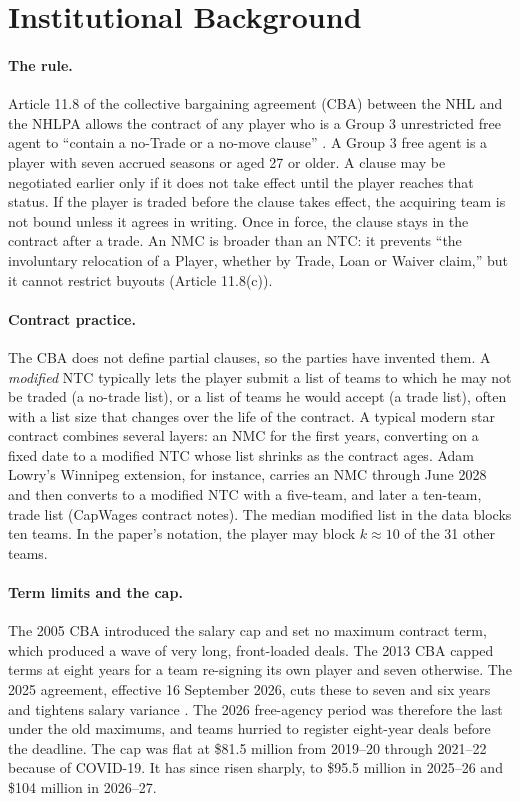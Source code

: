 \section{Institutional Background}\label{sec:background}

\paragraph{The rule.} Article 11.8 of the collective bargaining agreement (CBA) between the NHL and the NHLPA allows the contract of any player who is a Group 3 unrestricted free agent to ``contain a no-Trade or a no-move clause'' \citep{cba2013}. A Group 3 free agent is a player with seven accrued seasons or aged 27 or older. A clause may be negotiated earlier only if it does not take effect until the player reaches that status. If the player is traded before the clause takes effect, the acquiring team is not bound unless it agrees in writing. Once in force, the clause stays in the contract after a trade. An NMC is broader than an NTC: it prevents ``the involuntary relocation of a Player, whether by Trade, Loan or Waiver claim,'' but it cannot restrict buyouts (Article 11.8(c)).

\paragraph{Contract practice.} The CBA does not define partial clauses, so the parties have invented them. A \emph{modified} NTC typically lets the player submit a list of teams to which he may not be traded (a no-trade list), or a list of teams he would accept (a trade list), often with a list size that changes over the life of the contract. A typical modern star contract combines several layers: an NMC for the first years, converting on a fixed date to a modified NTC whose list shrinks as the contract ages. Adam Lowry's Winnipeg extension, for instance, carries an NMC through June 2028 and then converts to a modified NTC with a five-team, and later a ten-team, trade list (CapWages contract notes). The median modified list in the data blocks ten teams. In the paper's notation, the player may block $k\approx10$ of the 31 other teams.

\paragraph{Term limits and the cap.} The 2005 CBA introduced the salary cap and set no maximum contract term, which produced a wave of very long, front-loaded deals. The 2013 CBA capped terms at eight years for a team re-signing its own player and seven otherwise. The 2025 agreement, effective 16 September 2026, cuts these to seven and six years and tightens salary variance \citep{dfo_dfo_cba}. The 2026 free-agency period was therefore the last under the old maximums, and teams hurried to register eight-year deals before the deadline. The cap was flat at \$81.5 million from 2019--20 through 2021--22 because of COVID-19. It has since risen sharply, to \$95.5 million in 2025--26 and \$104 million in 2026--27.

